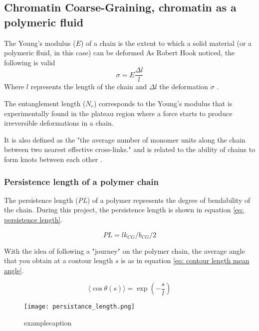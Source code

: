 
\subsection{Chromatin Coarse-Graining, chromatin as a polymeric fluid}

The Young's modulus ($E$) of a chain is the extent to which a solid material (or a polymeric fluid, in this case) can be deformed
As Robert Hook noticed, the following is valid 
\begin{equation}
    \sigma = E \frac{\Delta l}{l}
\end{equation}
Where $l$ represents the length of the chain and $\Delta l$ the deformation $\sigma$
\cite{grosbergGiantMoleculesHere2011}
.

The entanglement length ($N_e$) corresponds to the Young's modulus that is experimentally found in the plateau region where a force starts to produce irreversible deformations in a chain.



It is also defined as the "the average number of monomer units along the chain between two nearest effective cross-links."
and is related to the ability of chains to form knots between each other
\cite{grosbergGiantMoleculesHere2011}
.



\subsubsection{Persistence length of a polymer chain}

The persistence length (\textit{PL}) of a polymer represents the degree of bendability of the chain. During this project, the persistence length is shown in equation \ref{eq: persistence length}.


\begin{equation}
    PL = lk_{CG} / b_{CG} / 2
\end{equation}

With the idea of following a "journey" on the polymer chain, the average angle that you obtain at a contour length $s$ is as in equation \ref{eq: contour length mean angle}.


\begin{equation} \label{eq: contour length mean angle}
    \langle \cos{\theta(s)}\rangle = \exp{\left(-\frac{s}{l}\right)}
\end{equation}

\begin{figure}[H] 
    \centering 
    \texttt{[image: persistance\_length.png]} 
    \caption{examplecaption} 
    \label{examplelabel} 
\end{figure}

